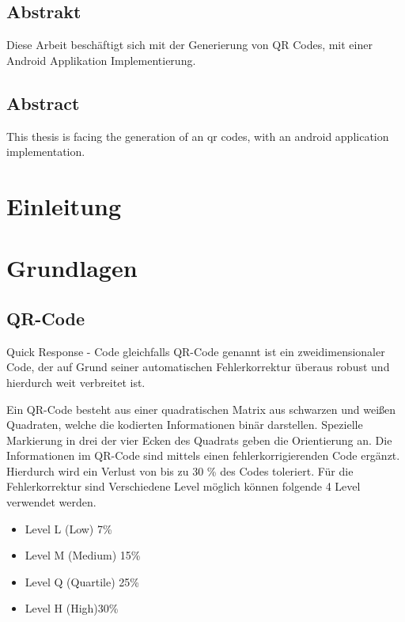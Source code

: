\documentclass[12pt,					%
							 oneside,			%
							 a4paper,			%
							 halfparskip,		%
							 liststotoc,			%
							 bibtotoc,			%
							 fleqn,				%
							 pointlessnumbers]	%
							 {scrreprt}
\begin{document}
	\onehalfspacing 					%
	

	
\section*{Abstrakt}
Diese Arbeit beschäftigt sich mit der Generierung von QR Codes, mit einer Android Applikation Implementierung.
\section*{Abstract}
This thesis is facing the generation of an qr codes, with an android application implementation.
\tableofcontents
{} 					%

\chapter{Einleitung}


\chapter{Grundlagen}
\section{QR-Code}
Quick Response - Code gleichfalls QR-Code genannt ist ein zweidimensionaler Code, der auf Grund seiner automatischen Fehlerkorrektur überaus robust und hierdurch weit verbreitet ist.


Ein QR-Code besteht aus einer quadratischen Matrix aus schwarzen und weißen Quadraten, welche die kodierten Informationen binär darstellen. Spezielle Markierung in drei der vier Ecken des Quadrats geben die Orientierung an. Die Informationen im QR-Code sind mittels einen fehlerkorrigierenden Code ergänzt. Hierdurch wird ein Verlust von bis zu 30 \% des Codes toleriert. Für die Fehlerkorrektur sind Verschiedene Level möglich können folgende 4 Level verwendet werden.
\begin{itemize}
\item Level L (Low) 7\%
\item Level M (Medium) 15\%
\item Level Q (Quartile) 25\% 
\item Level H (High)30\% 
\end{itemize}
\end{document}
